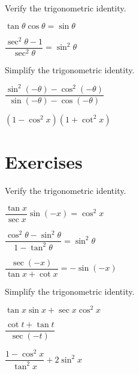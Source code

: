 \begin{example}
  Verify the trigonometric identity.\\
  \begin{enumerate*}
    \item $\tan \theta \cos \theta=\sin \theta$
    \item $\dfrac{{\sec}^2 \theta-1}{{\sec}^2 \theta}={\sin}^2 \theta$\hfill\null
  \end{enumerate*}
\end{example}

\begin{example}
 Simplify the trigonometric identity.\\
  \begin{enumerate*}
    \item $\dfrac{{\sin}^2(-\theta)-{\cos}^2(-\theta)}{\sin(-\theta)-\cos(-\theta)}$
    \item $(1-{\cos}^2 x)(1+{\cot}^2 x)$\hfill\null
  \end{enumerate*}
\end{example}

\newpage
\section*{Exercises}

\begin{exercise}
  Verify the trigonometric identity.\\
  \begin{enumerate*}
    \item $\dfrac{\tan x}{\sec x}\sin (-x)=\cos ^2x$
    \item $\dfrac{\cos ^2 \theta -\sin ^2 \theta }{1-\tan ^2 \theta }=\sin ^2 \theta$
    \item $\dfrac{\sec (-x)}{\tan x+\cot x}=-\sin (-x)$\hfill\null
  \end{enumerate*}
\end{exercise}
\begin{exercise}
  Simplify the trigonometric identity.\\
  \begin{enumerate*}
    \item $\tan x\sin x+\sec x\cos^2x$
    \item $\dfrac{\cot t+\tan t}{\sec (-t)}$
    \item $\dfrac{1-\cos ^2 x}{\tan ^2 x}+2\sin ^2 x$\hfill\null
  \end{enumerate*}
\end{exercise}

